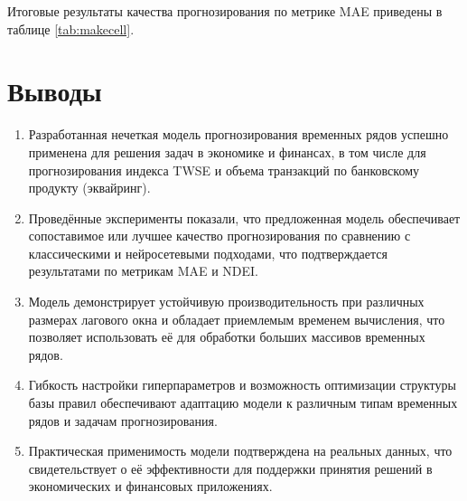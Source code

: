 Итоговые результаты качества прогнозирования по метрике MAE приведены в таблице \ref{tab:makecell}.


\section{Выводы}

\begin{enumerate}
	\item Разработанная нечеткая модель прогнозирования временных рядов успешно применена для решения задач в экономике и финансах, в том числе для прогнозирования индекса TWSE и объема транзакций по банковскому продукту (эквайринг).
	\item Проведённые эксперименты показали, что предложенная модель обеспечивает сопоставимое или лучшее качество прогнозирования по сравнению с классическими и нейросетевыми подходами, что подтверждается результатами по метрикам MAE и NDEI.
	\item Модель демонстрирует устойчивую производительность при различных размерах лагового окна и обладает приемлемым временем вычисления, что позволяет использовать её для обработки больших массивов временных рядов.
	\item Гибкость настройки гиперпараметров и возможность оптимизации структуры базы правил обеспечивают адаптацию модели к различным типам временных рядов и задачам прогнозирования.
	\item Практическая применимость модели подтверждена на реальных данных, что свидетельствует о её эффективности для поддержки принятия решений в экономических и финансовых приложениях.
\end{enumerate}